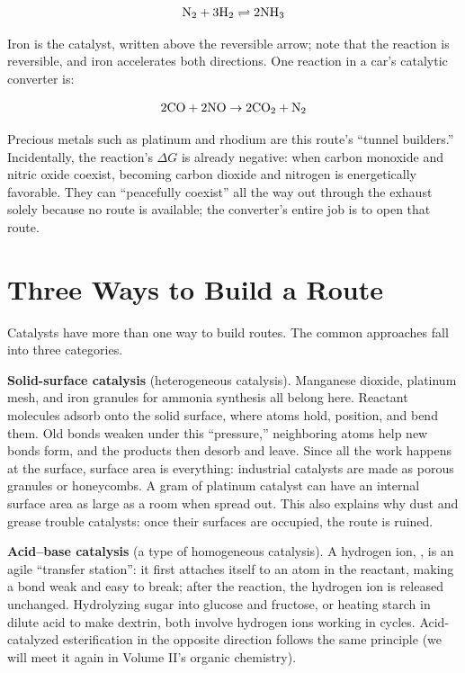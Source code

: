 \[\mathrm{N_2} + \mathrm{3H_2} \rightleftharpoons \mathrm{2NH_3}\]

Iron is the catalyst, written above the reversible arrow; note that the reaction is reversible, and iron accelerates both directions. One reaction in a car's catalytic converter is:

\[\mathrm{2CO} + \mathrm{2NO} \rightarrow \mathrm{2CO_2} + \mathrm{N_2}\]

Precious metals such as platinum and rhodium are this route's ``tunnel builders.'' Incidentally, the reaction's $\Delta G$ is already negative: when carbon monoxide and nitric oxide coexist, becoming carbon dioxide and nitrogen is energetically favorable. They can ``peacefully coexist'' all the way out through the exhaust solely because no route is available; the converter's entire job is to open that route.

\section{Three Ways to Build a Route}

Catalysts have more than one way to build routes. The common approaches fall into three categories.

\textbf{Solid-surface catalysis} (heterogeneous catalysis). Manganese dioxide, platinum mesh, and iron granules for ammonia synthesis all belong here. Reactant molecules adsorb onto the solid surface, where atoms hold, position, and bend them. Old bonds weaken under this ``pressure,'' neighboring atoms help new bonds form, and the products then desorb and leave. Since all the work happens at the surface, surface area is everything: industrial catalysts are made as porous granules or honeycombs. A gram of platinum catalyst can have an internal surface area as large as a room when spread out. This also explains why dust and grease trouble catalysts: once their surfaces are occupied, the route is ruined.

\textbf{Acid--base catalysis} (a type of homogeneous catalysis). A hydrogen ion, , is an agile ``transfer station'': it first attaches itself to an atom in the reactant, making a bond weak and easy to break; after the reaction, the hydrogen ion is released unchanged. Hydrolyzing sugar into glucose and fructose, or heating starch in dilute acid to make dextrin, both involve hydrogen ions working in cycles. Acid-catalyzed esterification in the opposite direction follows the same principle (we will meet it again in Volume II's organic chemistry).


